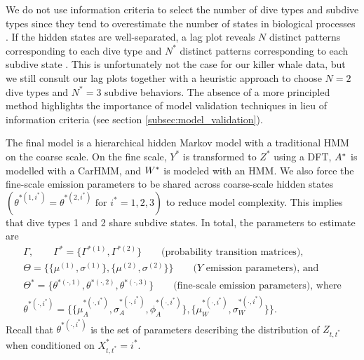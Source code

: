 We do not use information criteria to select the number of dive types and subdive types since they tend to overestimate the number of states in biological processes \citep{Pohle:2017}. If the hidden states are well-separated, a lag plot reveals $N$ distinct patterns corresponding to each dive type and $N^*$ distinct patterns corresponding to each subdive state \cite{Lawler:2019}. This is unfortunately not the case for our killer whale data, but we still consult our lag plots together with a heuristic approach to choose $N = 2$ dive types and $N^* = 3$ subdive behaviors. The absence of a more principled method highlights the importance of model validation techniques in lieu of information criteria (see section \ref{subsec:model_validation}). 

The final model is a hierarchical hidden Markov model with a traditional HMM on the coarse scale. On the fine scale, $Y^*$ is transformed to $Z^*$ using a DFT, $A^*$ is modelled with a CarHMM, and $W^*$ is modeled with an HMM. We also force the fine-scale emission parameters to be shared across coarse-scale hidden states $\left(\theta^{*(1,i^*)} = \theta^{*(2,i^*)} \text{ for } i^* = 1,2,3\right)$ to reduce model complexity. This implies that dive types 1 and 2 share subdive states. In total, the parameters to estimate are
%
\begin{gather*}
    \Gamma, \qquad \Gamma^{*} = \{\Gamma^{*(1)},\Gamma^{*(2)}\} \qquad \text{(probability transition matrices)}, \\
    \Theta = \{\{\mu^{(1)},\sigma^{(1)}\},\{\mu^{(2)},\sigma^{(2)}\}\} \qquad \text{($Y$ emission parameters), and} \\
    \Theta^* = \{\theta^{*(\cdot,1)},\theta^{*(\cdot,2)},\theta^{*(\cdot,3)}\}  \qquad \text{(fine-scale emission parameters), where} \\
    \theta^{*(\cdot,i^*)} =  \{\{\mu_A^{*(\cdot,i^*)},\sigma_A^{*(\cdot,i^*)},\phi_A^{*(\cdot,i^*)}\},\{\mu_W^{*(\cdot,i^*)},\sigma_W^{*(\cdot,i^*)}\}\}.
\end{gather*}
%
Recall that $\theta^{*(\cdot,i^*)}$ is the set of parameters describing the distribution of $Z_{t,t^*}$ when conditioned on $X^*_{t,t^*} = i^*$. 

